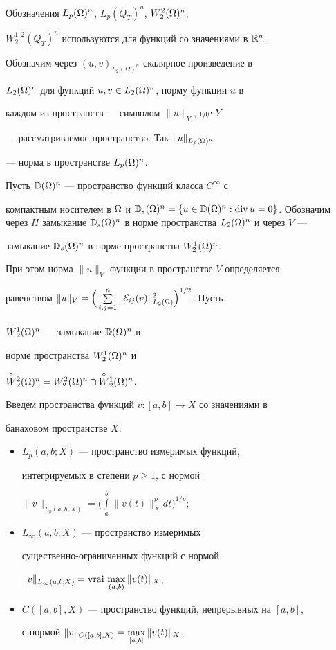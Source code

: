 Обозначения $L_p (\Omega)^n$, $L_p (Q_T)^n$, $W_2^2(\Omega)^n$,


$W_2^{1,2}(Q_T)^n$ используются для функций со значениями в $\Bbb R^n$.


Обозначим через $(u,v)_{L_2 (\Omega)^n}$ скалярное произведение в


$L_2(\Omega)^n$ для функций $u,v\in L_2(\Omega)^n$, норму функции $u$ в


каждом из пространств --- символом $\|u\|_Y$, где $Y$


--- рассматриваемое пространство. Так $\|u\|_{L_p(\Omega)^n}$


--- норма в пространстве $L_p (\Omega)^n$.





Пусть $\Bbb D(\Omega)^n$ --- пространство функций класса $C^\infty$ с


компактным носителем в $\Om$ и $\Bbb D_s(\Om)^n=\{u\in\Bbb D


(\Om)^n:\dv u=0\}$. Обозначим через $H$ замыкание $\Bbb


D_s (\Om)^n$ в норме пространства $L_2(\Om)^n$ и через $V$ ---


замыкание $\Bbb D_s(\Omega)^n$ в норме пространства $W_2^1(\Omega)^n$.


При этом норма $\|u\|_V$ функции в пространстве $V$ определяется


равенством $\|u\|_V=\Big(\suml{i,j=1}{n}


\|\E_{ij}(v)\|_{L_2(\Om)}^2\Big)^{1/2}$. Пусть


$\overset{\circ}{W}{}_2^1(\Omega)^n$ --- замыкание $\Bbb D(\Omega)^n$ в


норме пространства $W_2^1(\Omega)^n$ и


$\overset{\circ}{W}{}_2^2(\Omega)^n=W_2^2(\Omega)^n \cap\overset{\circ}{W}{}_2^1(\Omega)^n$.





Введем пространства функций $v: [a,b] \to X$ со значениями в


банаховом пространстве $X$:


\begin{itemize}


\item[] $L_p(a,b; X)$ --- пространство измеримых функций,


интегрируемых в степени $p\ge1$, с нормой


$\|v\|_{L_p(a,b; X)}=\Big(\int\limits_a^b\|v(t)\|_X^p dt\Big)^{1/p}$;


\item[] $L_\infty(a,b; X)$ --- пространство измеримых


существенно-ограниченных функций с нормой 


$\|v\|_{L_\infty(a,b;X)}=\mathrm{vrai}\,\max\limits_{(a,b)}\|v(t)\|_X$;


\item[] $C([a,b],X)$ --- пространство функций, непрерывных на $[a,b]$,


с нормой $\|v\|_{C([a,b],X)}=\max\limits_{[a,b]}\|v(t)\|_X$.


\end{itemize}


